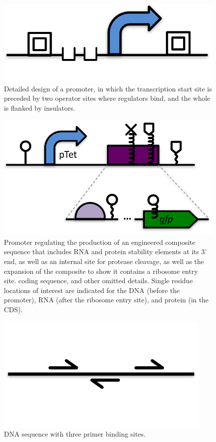 \begin{figure}[h!]
\includegraphics[scale=0.5]{figures/apdx-examples/apdx-exa7.pdf}
\caption{Detailed design of a promoter, in which the transcription start site is preceded by two operator sites where regulators bind, and the whole is flanked by insulators.}
\label{f:apdx:exa7}
\end{figure}

\begin{figure}[h!]
\includegraphics[scale=0.5]{figures/apdx-examples/apdx-exa8.pdf}
\caption{Promoter regulating the production of an engineered composite sequence that includes RNA and protein stability elements at its 3' end, as well as an internal site for protease cleavage, as well as the expansion of the composite to show it contains a ribosome entry site. coding sequence, and other omitted details.  Single residue locations of interest are indicated for the DNA (before the promoter), RNA (after the ribosome entry site), and protein (in the CDS).}
\label{f:apdx:exa8}
\end{figure}

\begin{figure}[h!]
\includegraphics[scale=0.5]{figures/apdx-examples/apdx-exa9.pdf}
\caption{DNA sequence with three primer binding sites.}
\label{f:apdx:exa9}
\end{figure}

